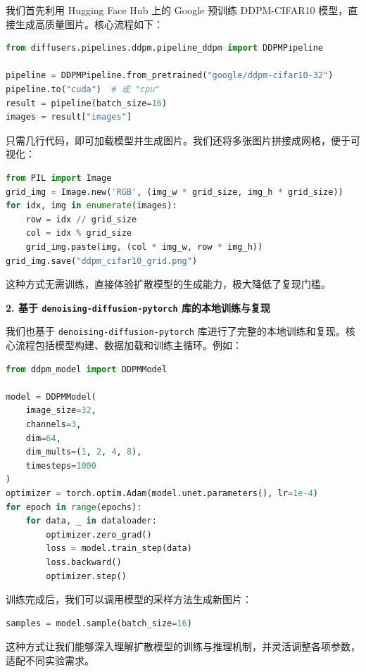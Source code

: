 \documentclass{ctexart}
\begin{document}
我们首先利用 Hugging Face Hub 上的 Google 预训练 DDPM-CIFAR10 模型，直接生成高质量图片。核心流程如下：

\begin{lstlisting}[language=python]
from diffusers.pipelines.ddpm.pipeline_ddpm import DDPMPipeline

pipeline = DDPMPipeline.from_pretrained("google/ddpm-cifar10-32")
pipeline.to("cuda")  # 或 "cpu"
result = pipeline(batch_size=16)
images = result["images"]
\end{lstlisting}

只需几行代码，即可加载模型并生成图片。我们还将多张图片拼接成网格，便于可视化：

\begin{lstlisting}[language=python]
from PIL import Image
grid_img = Image.new('RGB', (img_w * grid_size, img_h * grid_size))
for idx, img in enumerate(images):
    row = idx // grid_size
    col = idx % grid_size
    grid_img.paste(img, (col * img_w, row * img_h))
grid_img.save("ddpm_cifar10_grid.png")
\end{lstlisting}

这种方式无需训练，直接体验扩散模型的生成能力，极大降低了复现门槛。

\vspace{0.5em}
\noindent
\textbf{2. 基于 \texttt{denoising-diffusion-pytorch} 库的本地训练与复现}

我们也基于 \texttt{denoising-diffusion-pytorch} 库进行了完整的本地训练和复现。核心流程包括模型构建、数据加载和训练主循环。例如：

\begin{lstlisting}[language=python]
from ddpm_model import DDPMModel

model = DDPMModel(
    image_size=32,
    channels=3,
    dim=64,
    dim_mults=(1, 2, 4, 8),
    timesteps=1000
)
optimizer = torch.optim.Adam(model.unet.parameters(), lr=1e-4)
for epoch in range(epochs):
    for data, _ in dataloader:
        optimizer.zero_grad()
        loss = model.train_step(data)
        loss.backward()
        optimizer.step()
\end{lstlisting}

训练完成后，我们可以调用模型的采样方法生成新图片：

\begin{lstlisting}[language=python]
samples = model.sample(batch_size=16)
\end{lstlisting}
\noindent
这种方式让我们能够深入理解扩散模型的训练与推理机制，并灵活调整各项参数，适配不同实验需求。
\end{document}
